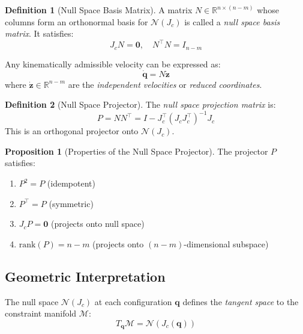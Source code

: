 \documentclass[11pt,a4paper]{article}
\theoremstyle{definition}
\newtheorem{definition}{Definition}[section]
\newtheorem{proposition}[theorem]{Proposition}
\newcommand{\R}{\mathbb{R}}
\newcommand{\nullspace}{\mathcal{N}}
\newcommand{\Jc}{J_c}
\newcommand{\qvec}{\bm{q}}
\begin{document}
\begin{definition}[Null Space Basis Matrix]
A matrix $N \in \R^{n \times (n-m)}$ whose columns form an orthonormal basis for $\nullspace(\Jc)$ is called a \emph{null space basis matrix}. It satisfies:
\begin{equation}
    \Jc N = \bm{0}, \quad N^\top N = I_{n-m}
\end{equation}
\end{definition}

Any kinematically admissible velocity can be expressed as:
\begin{equation}
    \boxed{\dot{\qvec} = N \dot{\bm{z}}}
\end{equation}
where $\dot{\bm{z}} \in \R^{n-m}$ are the \emph{independent velocities} or \emph{reduced coordinates}.

\begin{definition}[Null Space Projector]
The \emph{null space projection matrix} is:
\begin{equation}
    \boxed{P = N N^\top = I - \Jc^\top (\Jc \Jc^\top)^{-1} \Jc}
\end{equation}
This is an orthogonal projector onto $\nullspace(\Jc)$.
\end{definition}

\begin{proposition}[Properties of the Null Space Projector]
The projector $P$ satisfies:
\begin{enumerate}[label=(\roman*)]
    \item $P^2 = P$ \quad (idempotent)
    \item $P^\top = P$ \quad (symmetric)
    \item $\Jc P = \bm{0}$ \quad (projects onto null space)
    \item $\text{rank}(P) = n - m$ \quad (projects onto $(n-m)$-dimensional subspace)
\end{enumerate}
\end{proposition}

\subsection{Geometric Interpretation}

The null space $\nullspace(\Jc)$ at each configuration $\qvec$ defines the \emph{tangent space} to the constraint manifold $\mathcal{M}$:
\begin{equation}
    T_\qvec \mathcal{M} = \nullspace(\Jc(\qvec))
\end{equation}
\end{document}
